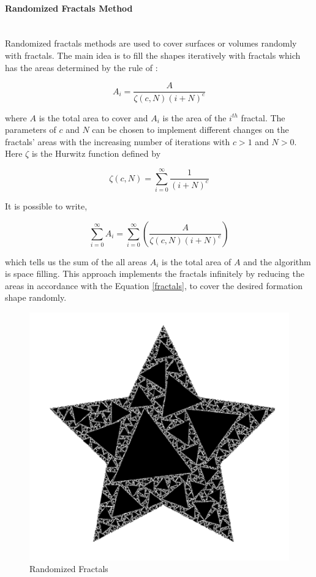 \paragraph{Randomized Fractals Method}\hspace{0pt} \\
Randomized fractals methods are used to cover surfaces or volumes randomly with fractals. The main idea is to fill the shapes iteratively with fractals which has the areas determined by the rule of \cite{26} :

\begin{equation} \label{fractals}
A_i = \frac{A}{\zeta(c,N)(i+N)^c}
\end{equation}

where $A$ is the total area to cover and $A_i$ is the area of the $i^{th}$ fractal. The parameters of $c$ and $N$ can be chosen to implement different changes on the fractals' areas with the increasing number of iterations with $c>1$ and $N>0$. Here  $\zeta$ is the Hurwitz function defined by

\begin{equation}
\zeta(c,N) = \sum_{i=0}^{\infty} \frac{1}{(i+N)^c}
\end{equation}

It is possible to write, 
	
\begin{equation}
\sum_{i=0}^{\infty}A_i = \sum_{i = 0}^{\infty}\left(\frac{A}{\zeta(c,N)(i+N)^c}\right)
\end{equation}
	
which tells us the sum of the all areas $A_i$ is the total area of $A$ and the algorithm is space filling. This approach implements the fractals infinitely by reducing the areas in accordance with the Equation \ref{fractals}, to cover the desired formation shape randomly. 

\begin{figure}[H]
\caption{Randomized Fractals \cite{26}}
\centering
\includegraphics[scale = 0.60]{randomized}
\end{figure}
	
